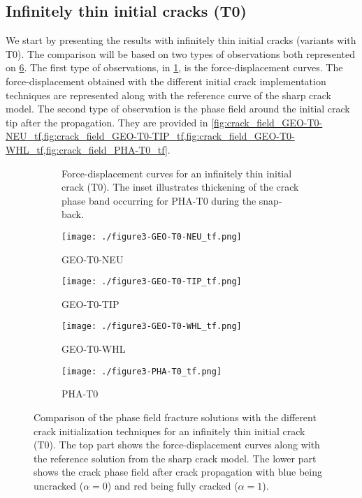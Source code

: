 \documentclass[OptSoft]{jtcam_preprint}
\begin{document}
\subsection{Infinitely thin initial cracks (T0)}

We start by presenting the results with infinitely thin initial cracks (variants with T0).
The comparison will be based on two types of observations both represented on \cref{fig:solutions_T0}.
The first type of observations, in \cref{fig:Fu_T0}, is the force-displacement curves.
The force-displacement obtained with the different initial crack implementation techniques
are represented along with the reference curve of the sharp crack model.
The second type of observation is the phase field around the initial crack tip after the propagation.
They are provided in \cref{fig:crack_field_GEO-T0-NEU_tf,fig:crack_field_GEO-T0-TIP_tf,fig:crack_field_GEO-T0-WHL_tf,fig:crack_field_PHA-T0_tf}.

\begin{figure}
  \centering
  \begin{subfigure}{\textwidth}
    \centering
    
    \caption{Force-displacement curves for an infinitely thin initial crack (T0). The inset illustrates thickening of the crack phase band occurring for PHA-T0 during the snap-back.}
    \label{fig:Fu_T0}
  \end{subfigure}
  \begin{subfigure}{0.49\textwidth}
    \centering
    \texttt{[image: ./figure3-GEO-T0-NEU\_tf.png]}
    \caption{GEO-T0-NEU}
    \label{fig:crack_field_GEO-T0-NEU_tf}
  \end{subfigure}
  \begin{subfigure}{0.49\textwidth}
    \centering
    \texttt{[image: ./figure3-GEO-T0-TIP\_tf.png]}
    \caption{GEO-T0-TIP}
    \label{fig:crack_field_GEO-T0-TIP_tf}
  \end{subfigure}
  \begin{subfigure}{0.49\textwidth}
    \centering
    \texttt{[image: ./figure3-GEO-T0-WHL\_tf.png]}
    \caption{GEO-T0-WHL}
    \label{fig:crack_field_GEO-T0-WHL_tf}
  \end{subfigure}
  \begin{subfigure}{0.49\textwidth}
    \centering
    \texttt{[image: ./figure3-PHA-T0\_tf.png]}
    \caption{PHA-T0}
    \label{fig:crack_field_PHA-T0_tf}
  \end{subfigure}
  \caption{Comparison of the phase field fracture solutions with the different crack initialization techniques for an infinitely thin initial crack (T0). The top part shows the force-displacement curves along with the reference solution from the sharp crack model. The lower part shows the crack phase field after crack propagation with blue being uncracked ($\alpha=0$) and red being fully cracked ($\alpha=1$).}
  \label{fig:solutions_T0}
\end{figure}
\end{document}
